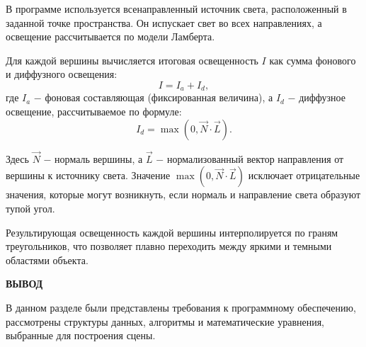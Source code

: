 В программе используется всенаправленный источник света, расположенный в заданной точке пространства. Он испускает свет во всех направлениях, а освещение рассчитывается по модели Ламберта.

Для каждой вершины вычисляется итоговая освещенность $I$ как сумма фонового и диффузного освещения:
\begin{equation}
I = I_{a} + I_{d},
\end{equation}
где $I_{a}$ $-$ фоновая составляющая (фиксированная величина), а $I_{d}$ $-$ диффузное освещение, рассчитываемое по формуле:
\begin{equation}
I_{d} = \max(0, \vec{N} \cdot \vec{L}).
\end{equation}

Здесь $\vec{N}$ $-$ нормаль вершины, а $\vec{L}$ $-$ нормализованный вектор направления от вершины к источнику света. Значение $\max(0, \vec{N} \cdot \vec{L})$ исключает отрицательные значения, которые могут возникнуть, если нормаль и направление света образуют тупой угол.

Результирующая освещенность каждой вершины интерполируется по граням треугольников, что позволяет плавно переходить между яркими и темными областями объекта.







\vspace{5mm}
\textbf{ВЫВОД}

В данном разделе были представлены требования к программному обеспечению, рассмотрены структуры данных, алгоритмы и математические уравнения, выбранные для построения сцены.

\clearpage